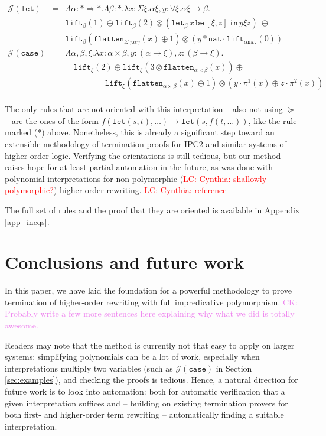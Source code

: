 \documentclass[a4paper,UKenglish,cleveref,autoref,numberwithinsect]{lipics-v2019}
\theoremstyle{definition}
\newcommand{\arrkind}{\Rightarrow}
\newcommand{\arrtype}{\rightarrow}
\newcommand{\quant}[2]{\forall #1.#2}
\newcommand{\red}{\longrightarrow}
\newcommand{\nat}{\mathtt{nat}}
\newcommand{\flatten}{\mathtt{flatten}}
\newcommand{\lift}{\mathtt{lift}}
\newcommand{\Termmap}{\mathcal{J}}
\newcommand{\xlet}[4]{\mathtt{let}_{#1}\,#2\,\mathtt{be}\,[#3]\,\mathtt{in}\,#4}
\newcommand{\CK}[1]{\textcolor{violet}{CK: #1}}
\newcommand{\LC}[1]{\textcolor{red}{LC: #1}}
\begin{document}
\[
\begin{array}{rcl}
\Termmap(\mathtt{let}) & = & \Lambda \alpha : * \arrkind * . \Lambda \beta : * . \lambda x : \Sigma \xi . \alpha\xi,
  y : \quant{\xi}{\alpha\xi \arrtype \beta}. \\
  & & \lift_\beta(1) \oplus \lift_\beta(2) \otimes
    (\xlet{\beta}{x}{\xi,z}{y\xi z})\ \oplus \\
  & & \lift_\beta(\flatten_{\Sigma\gamma.\alpha\gamma}(x) \oplus 1)
    \otimes (y * \nat \cdot \lift_{\alpha\nat}(0)) \\
\Termmap(\mathtt{case}) & = & \Lambda \alpha,\beta,\xi . \lambda x :
  \alpha \times \beta, y : (\alpha \arrtype \xi), z : (\beta \arrtype
  \xi). \\
  & & \quad
  \lift_\xi(2) \oplus
  \lift_\xi(3 \otimes \flatten_{\alpha \times \beta}(x)) \oplus \\
  & & \quad\phantom{ABCDE}
  \lift_\xi(\flatten_{\alpha \times \beta}(x) \oplus 1)
    \otimes (y \cdot \pi^1(x) \oplus z \cdot \pi^2(x)) \\
\end{array}
\]

The only rules that are not oriented with this interpretation -- also
not using $\succeq$ -- are the ones of the form
$f(\mathtt{let}(s,t), \dots) \red \mathtt{let}(s,f(t,\dots))$, like
the rule marked (*) above. Nonetheless, this is already a significant
step toward an extensible methodology of termination proofs for IPC2
and similar systems of higher-order logic. Verifying the orientations
is still tedious, but our method raises hope for at least partial
automation in the future, as was done with polynomial interpretations
for non-polymorphic (\LC{Cynthia: shallowly polymorphic?})
higher-order rewriting. \LC{Cynthia: reference}

The full set of rules and the proof that they are oriented is
available in Appendix \ref{app_ineqs}.

\section{Conclusions and future work}

In this paper, we have laid the foundation for a powerful methodology
to prove termination of higher-order rewriting with full impredicative
polymorphism.
\CK{Probably write a few more sentences here explaining why what we did
is totally awesome.}

Readers may note that the method is currently not that easy to apply on
larger systems: simplifying polynomials can be a lot of work,
especially when interpretations multiply two variables (such as
$\Termmap(\mathtt{case})$ in Section \ref{sec:examples}), and checking
the proofs is tedious.  Hence, a natural direction for future work is
to look into automation: both for automatic verification that a given
interpretation suffices and -- building on existing termination provers
for both first- and higher-order term rewriting -- automatically finding
a suitable interpretation.
\end{document}
